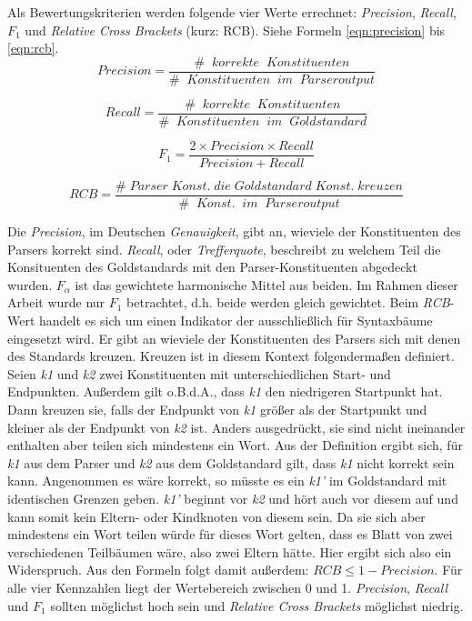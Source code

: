 Als Bewertungskriterien werden folgende vier Werte errechnet: \textit{Precision}, \textit{Recall}, \(F_1\) und \textit{Relative Cross Brackets} (kurz: RCB). Siehe Formeln \ref{eqn:precision} bis \ref{eqn:rcb}. \\ 
\begin{equation}
Precision = \frac{\# \;\; korrekte \;\; Konstituenten}{ \# \;\; Konstituenten \;\; im \;\; Parseroutput}
\label{eqn:precision}
\end{equation}

\begin{equation}
Recall = \frac{\# \;\; korrekte \;\; Konstituenten}{ \# \;\; Konstituenten \;\; im \;\; Goldstandard}
\end{equation}

\begin{equation}
F_1 = \frac{2 \times Precision \times Recall}{ Precision + Recall}
\end{equation}

\begin{equation}
RCB = \frac{\# \; Parser \; Konst. \; die \; Goldstandard \; Konst. \; kreuzen}{ \# \;\; Konst. \;\; im \;\; Parseroutput}
\label{eqn:rcb}
\end{equation}

Die \textit{Precision}, im Deutschen \textit{Genauigkeit}, gibt an, wieviele der Konstituenten des Parsers korrekt sind. \textit{Recall}, oder \textit{Trefferquote}, beschreibt zu welchem Teil die Konsituenten des Goldstandards mit den Parser-Konstituenten abgedeckt wurden. \(F_\alpha\) ist das gewichtete harmonische Mittel aus beiden. Im Rahmen dieser Arbeit wurde nur \(F_1\) betrachtet, d.h. beide werden gleich gewichtet. Beim \textit{RCB}-Wert handelt es sich um einen Indikator der ausschließlich für Syntaxbäume eingesetzt wird. Er gibt an wieviele der Konstituenten des Parsers sich mit denen des Standards kreuzen. Kreuzen ist in diesem Kontext folgendermaßen definiert. Seien \textit{k1} und \textit{k2} zwei Konstituenten mit unterschiedlichen Start- und Endpunkten. Außerdem gilt o.B.d.A., dass \textit{k1} den niedrigeren Startpunkt hat. Dann kreuzen sie, falls der Endpunkt von \textit{k1} größer als der Startpunkt und kleiner als der Endpunkt von \textit{k2} ist. Anders ausgedrückt, sie sind nicht ineinander enthalten aber teilen sich mindestens ein Wort. %
Aus der Definition ergibt sich, für \textit{k1} aus dem Parser und \textit{k2} aus dem Goldstandard gilt, dass \textit{k1} nicht korrekt sein kann. Angenommen es wäre korrekt, so müsste es ein \textit{k1'} im Goldstandard mit identischen Grenzen geben. \textit{k1'} beginnt vor \textit{k2} und hört auch vor diesem auf und kann somit kein Eltern- oder Kindknoten von diesem sein. Da sie sich aber mindestens ein Wort teilen würde für dieses Wort gelten, dass es Blatt von zwei verschiedenen Teilbäumen wäre, also zwei Eltern hätte. Hier ergibt sich also ein Widerspruch. Aus den Formeln folgt damit außerdem: \( RCB \leq 1 - Precision \). Für alle vier Kennzahlen liegt der Wertebereich zwischen 0 und 1. \textit{Precision}, \textit{Recall} und \(F_1\) sollten möglichst hoch sein und \textit{Relative Cross Brackets} möglichst niedrig.